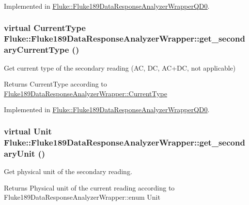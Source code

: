 Implemented in \hyperlink{classFluke_1_1Fluke189DataResponseAnalyzerWrapperQD0_a26e5925f4ca96aeea4115c44aa8ed1a8}{Fluke::Fluke189DataResponseAnalyzerWrapperQD0}.\hypertarget{classFluke_1_1Fluke189DataResponseAnalyzerWrapper_a21a39a54587e31af04c931b46aa11806}{
\subsubsection[{get\_\-secondaryCurrentType}]{\setlength{\rightskip}{0pt plus 5cm}virtual {\bf CurrentType} Fluke::Fluke189DataResponseAnalyzerWrapper::get\_\-secondaryCurrentType ()}}
\label{classFluke_1_1Fluke189DataResponseAnalyzerWrapper_a21a39a54587e31af04c931b46aa11806}
Get current type of the secondary reading (AC, DC, AC+DC, not applicable) \begin{DoxyReturn}{Returns}
CurrentType according to \hyperlink{classFluke_1_1Fluke189DataResponseAnalyzerWrapper_afef24496da239e3613c40ad3582d7adc}{Fluke189DataResponseAnalyzerWrapper::CurrentType} 
\end{DoxyReturn}


Implemented in \hyperlink{classFluke_1_1Fluke189DataResponseAnalyzerWrapperQD0_aa46ac22750b412df37ae24db84fab138}{Fluke::Fluke189DataResponseAnalyzerWrapperQD0}.\hypertarget{classFluke_1_1Fluke189DataResponseAnalyzerWrapper_a8c24a1f3d5abae862ffa06a3a7ac44f1}{
\subsubsection[{get\_\-secondaryUnit}]{\setlength{\rightskip}{0pt plus 5cm}virtual {\bf Unit} Fluke::Fluke189DataResponseAnalyzerWrapper::get\_\-secondaryUnit ()}}
\label{classFluke_1_1Fluke189DataResponseAnalyzerWrapper_a8c24a1f3d5abae862ffa06a3a7ac44f1}
Get physical unit of the secondary reading. \begin{DoxyReturn}{Returns}
Physical unit of the current reading according to Fluke189DataResponseAnalyzerWrapper::enum Unit 
\end{DoxyReturn}


